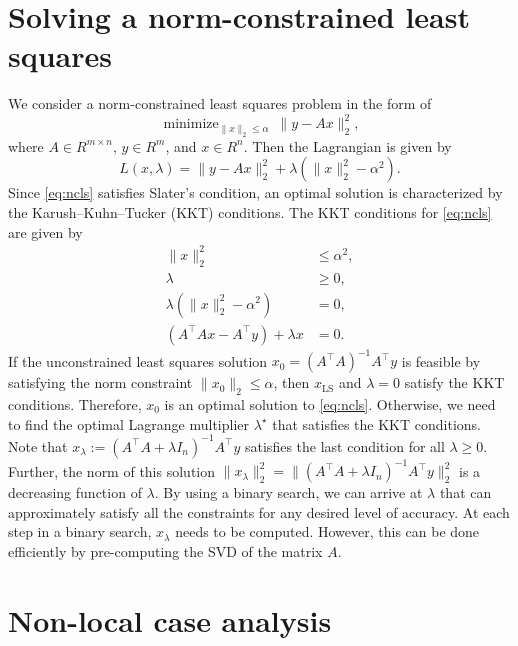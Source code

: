 \documentclass[11pt]{article}
\begin{document}
\section{Solving a norm-constrained least squares}
\label{sec:app_least_squares_l2_constraint}
We consider a norm-constrained least squares problem in the form of
\begin{equation}
\label{eq:ncls}
\mathop{\mathrm{minimize}}_{\|x\|_2 \leq \alpha } \ \| y - Ax \|_2^2,
\end{equation}
where $A \in R^{m \times n}$, $y \in R^m$, and $x \in R^n$. 
Then the Lagrangian is given by
\[ 
L(x, \lambda) =  \|y - Ax \|_2^2  + \lambda (\|x\|_2^2 - \alpha^2 ). 
\]
Since \eqref{eq:ncls} satisfies Slater's condition, an optimal solution is characterized by the Karush–Kuhn–Tucker (KKT) conditions. 
The KKT conditions for \eqref{eq:ncls} are given by 
\begin{align*}
    \|x\|_2^2 & \leq \alpha^2, \\
    \lambda & \geq 0, \\
    \lambda (\| x\|_2^2 - \alpha^2 ) & = 0, \\
    ( A^\top A x - A^\top y ) + \lambda x
 & = 0. 
\end{align*}
If the unconstrained least squares solution $x_0 = (A^\top A)^{-1} A^\top y$ is feasible by satisfying the norm constraint $\| x_0 \|_2 \leq \alpha$, then $x_{\mathrm{LS}}$ and $\lambda=0$ satisfy the KKT conditions. 
Therefore, $x_0$ is an optimal solution to \eqref{eq:ncls}. 
Otherwise, we need to find the optimal Lagrange multiplier $\lambda^\star$ that satisfies the KKT conditions. 
Note that $x_\lambda := (A^\top A + \lambda I_n)^{-1} A^\top y$ satisfies the last condition for all $\lambda \geq 0$. Further, the norm of this solution $\|x_\lambda\|_2^2 = \|(A^\top A + \lambda I_n)^{-1} A^\top y\|_2^2$ is a decreasing function of $\lambda$. 
By using a binary search, we can arrive at $\lambda$ that can approximately satisfy all the constraints for any desired level of accuracy. 
At each step in a binary search, $x_\lambda$ needs to be computed. However, this can be done efficiently by pre-computing the SVD of the matrix $A$.


\section{Non-local case analysis}
\label{sec:nonlocal}
\end{document}
